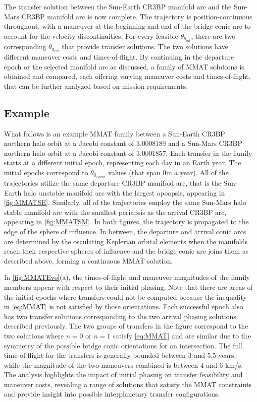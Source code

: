 The transfer solution between the Sun-Earth CR3BP manifold arc and the Sun-Mars CR3BP manifold arc
is now complete. The trajectory is position-continuous throughout, with a maneuver at the beginning
and end of the bridge conic arc to account for the velocity discontinuities. For every feasible
$\theta_{b_{int}}$, there are two corresponding $\theta_{a_{int}}$ that provide transfer solutions.
The two solutions have different maneuver costs and times-of-flight. By continuing in the departure
epoch or the selected manifold arc as discussed, a family of MMAT solutions is obtained and
compared, each offering varying maneuver costs and times-of-flight, that can be further analyzed
based on mission requirements.

\subsection{Example}
What follows is an example MMAT family between a Sun-Earth CR3BP northern halo orbit at a Jacobi
constant of $3.0008189$ and a Sun-Mars CR3BP northern halo orbit at a Jacobi constant of
$3.0001857$. Each transfer in the family starts at a different initial epoch, representing each day
in an Earth year. The initial epochs correspond to $\theta_{0_{Earth}}$ values (that span
0\textdegree in a year). All of the trajectories utilize the same departure CR3BP
manifold arc, that is the Sun-Earth halo unstable manifold arc with the largest apoapsis,
appearing in \cref{fig:MMATSE}. Similarly, all of the trajectories employ the same Sun-Mars halo
stable manifold arc with the smallest periapsis as the arrival CR3BP arc, appearing in
\cref{fig:MMATSM}. In both figures, the trajectory is propagated to the edge of the sphere of
influence. In between, the departure and arrival conic arcs are determined by the osculating
Keplerian orbital elements when the manifolds reach their respective spheres of influence and the
bridge conic arc joins them as described above, forming a continuous MMAT solution.

In \cref{fig:MMATEvo}(a), the times-of-flight and maneuver magnitudes of the family members appear
with respect to their initial phasing. Note that there are areas of the initial epochs where
transfers could not be computed because the inequality in \cref{eq:MMAT} is not satisfied by those
orientations. Each successful epoch also has two transfer solutions corresponding to the two
arrival phasing solutions described previously. The two groups of transfers in the figure
correspond to the two solutions where $n=0$ or $n=1$ satisfy \cref{eq:MMAT} and are similar due to
the symmetry of the possible bridge conic orientations for an intersection. The full time-of-flight
for the transfers is generally bounded between $3$ and $5.5$ years, while the magnitude of the two
maneuvers combined is between $4$ and $6$ km/s. The analysis highlights the impact of initial
phasing on transfer feasibility and maneuver costs, revealing a range of solutions that satisfy the
MMAT constraints and provide insight into possible interplanetary transfer configurations.

